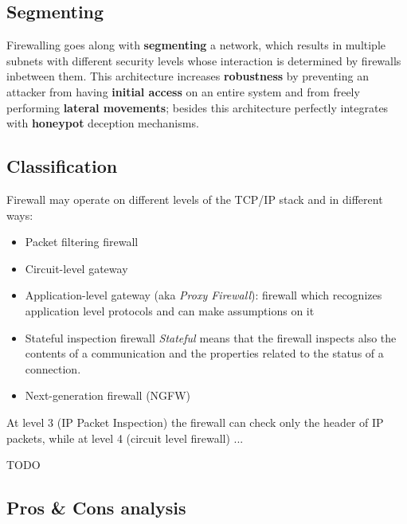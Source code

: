 \subsection{Segmenting}
Firewalling goes along with \textbf{segmenting} a network,
which results in multiple subnets with different security levels whose interaction is determined by firewalls inbetween them.
This architecture increases \textbf{robustness} by preventing an attacker from having \textbf{initial access} on an entire system and from freely performing \textbf{lateral movements};
besides this architecture perfectly integrates with \textbf{honeypot} deception mechanisms.

\subsection{Classification}
Firewall may operate on different levels of the TCP/IP stack and in different ways:
\begin{itemize}
   \item Packet filtering firewall
   \item Circuit-level gateway
   \item Application-level gateway (aka \textit{Proxy Firewall}):
   firewall which recognizes application level protocols and can make assumptions on it
   \item Stateful inspection firewall
   \textit{Stateful} means that the firewall inspects also the contents of a communication and the properties related to the status of a connection.
   \item Next-generation firewall (NGFW)
\end{itemize} 

At level 3 (IP Packet Inspection) the firewall can check only the header of IP packets,
while at level 4 (circuit level firewall) ...\nl

TODO\nl

\subsection{Pros \& Cons analysis}

